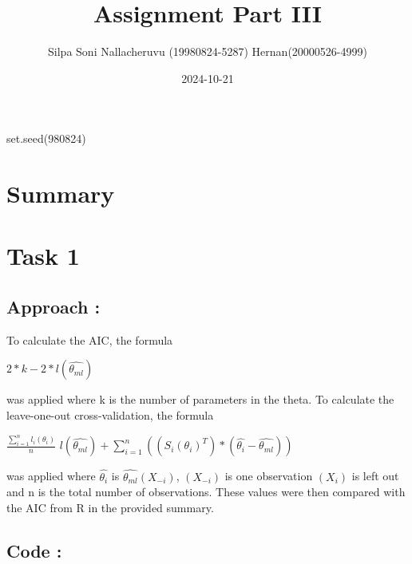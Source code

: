 \documentclass[
]{article}
\title{Assignment Part III}
\author{Silpa Soni Nallacheruvu (19980824-5287) Hernan(20000526-4999)}
\date{2024-10-21}
\begin{document}
\maketitle

set.seed(980824)

\section{Summary}\label{summary}

\section{Task 1}\label{task-1}

\subsection{Approach :}\label{approach}

To calculate the AIC, the formula

\(2*k - 2*l(\hat{\theta_{ml}})\)

was applied where k is the number of parameters in the theta. To
calculate the leave-one-out cross-validation, the formula

\(\frac{\sum_{i=1}^{n} {l_i(\theta_i)}}{n}\)
\(l(\hat{\theta_{ml}}) + \sum_{i=1}^{n} (({S_i(\theta_i)}^T)*(\hat{\theta_i} - \hat{\theta_{ml}}))\)

was applied where \(\hat{\theta_i}\) is \(\hat{\theta_{ml}}(X_{-i})\),
\((X_{-i})\) is one observation \((X_{i})\) is left out and n is the
total number of observations. These values were then compared with the
AIC from R in the provided summary.

\subsection{Code :}\label{code}
\end{document}
